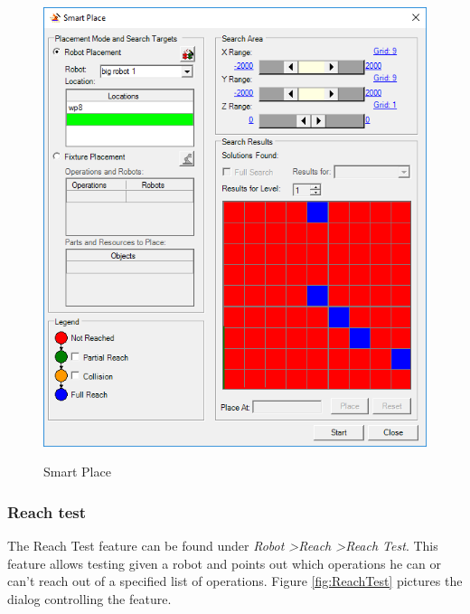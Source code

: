 \begin{figure}[H]
    \caption{Smart Place}
    \centering
    \includegraphics{smart_place}
    \label{fig:SmartPlace}
\end{figure}

\subsubsection{Reach test}
The Reach Test feature can be found under \emph{Robot \textgreater Reach \textgreater Reach Test}.
This feature allows testing given a robot and points out which operations he can or can't reach out of a specified list of operations.
Figure \ref{fig:ReachTest} pictures the dialog controlling the feature.  \\

